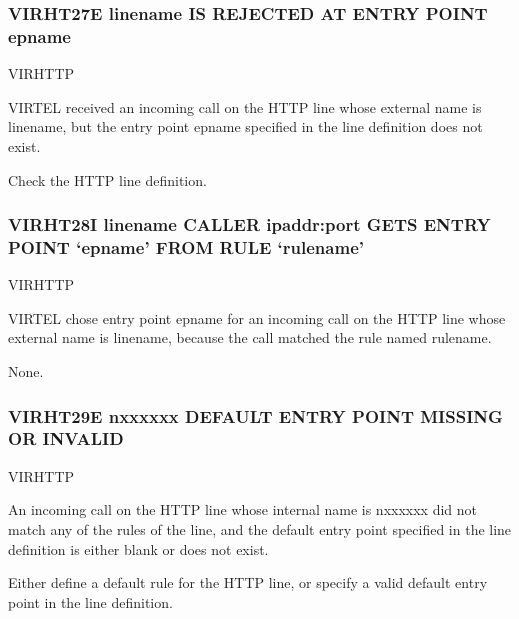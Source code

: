 \documentclass[letterpaper,10pt,english]{sphinxmanual}
\begin{document}
\subsubsection{VIRHT27E linename IS REJECTED AT ENTRY POINT epname}
\label{\detokenize{messages:virht27e-linename-is-rejected-at-entry-point-epname}}\begin{description}
\sphinxAtStartPar
VIRHTTP

\sphinxAtStartPar
VIRTEL received an incoming call on the HTTP line whose external name is linename, but the entry point epname specified in the line definition does not exist.

\sphinxAtStartPar
Check the HTTP line definition.

\end{description}


\subsubsection{VIRHT28I linename CALLER ipaddr:port GETS ENTRY POINT ‘epname’ FROM RULE ‘rulename’}
\label{\detokenize{messages:virht28i-linename-caller-ipaddr-port-gets-entry-point-epname-from-rule-rulename}}\begin{description}
\sphinxAtStartPar
VIRHTTP

\sphinxAtStartPar
VIRTEL chose entry point epname for an incoming call on the HTTP line whose external name is linename, because the call matched the rule named rulename.

\sphinxAtStartPar
None.

\end{description}


\subsubsection{VIRHT29E n\sphinxhyphen{}xxxxxx DEFAULT ENTRY POINT MISSING OR INVALID}
\label{\detokenize{messages:virht29e-n-xxxxxx-default-entry-point-missing-or-invalid}}\begin{description}
\sphinxAtStartPar
VIRHTTP

\sphinxAtStartPar
An incoming call on the HTTP line whose internal name is n\sphinxhyphen{}xxxxxx did not match any of the rules of the line, and the default entry point specified in the line definition is either blank or does not exist.

\sphinxAtStartPar
Either define a default rule for the HTTP line, or specify a valid default entry point in the line definition.

\end{description}
\end{document}
